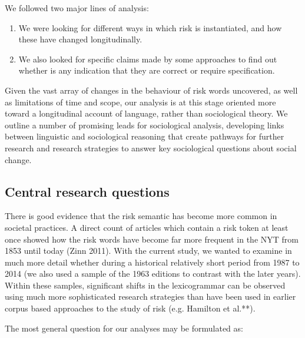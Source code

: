 \documentclass{report}
\begin{document}
We followed two major lines of analysis:

\begin{enumerate}
\item We were looking for different ways in which risk is instantiated, and how these have changed longitudinally.
\item We also looked for specific claims made by some approaches to find out whether is any indication that they are correct or require specification. 
\end{enumerate}
%
Given the vast array of changes in the behaviour of risk words uncovered, as well as limitations of time and scope, our analysis is at this stage oriented more toward a longitudinal account of language, rather than sociological theory. We outline a number of promising leads for sociological analysis, developing links between linguistic and sociological reasoning that create pathways for further research and research strategies to answer key sociological questions about social change.

\subsection{Central research questions}

There is good evidence that the risk semantic has become more common in societal practices. A direct count of articles which contain a risk token at least once showed how the risk words have become far more frequent in the NYT from 1853 until today (Zinn 2011). With the current study, we wanted to examine in much more detail whether during a historical relatively short period from 1987 to 2014 (we also used a sample of the 1963 editions to contrast with the later years). Within these samples, significant shifts in the lexicogrammar can be observed using much more sophisticated research strategies than have been used in earlier corpus based approaches to the study of risk (e.g. Hamilton et al.**).



The most general question for our analyses may be formulated as:
\end{document}
